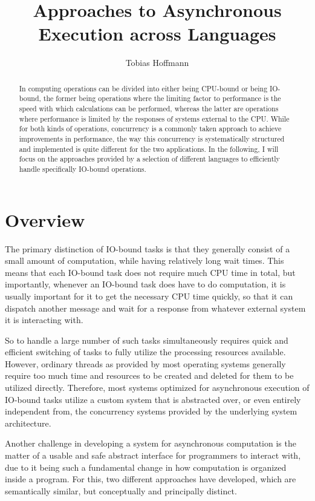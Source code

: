 \documentclass[a4paper,UKenglish,cleveref, autoref, thm-restate]{lipics-v2021}
\title{Approaches to Asynchronous Execution across Languages}
\author{Tobias Hoffmann}{Albert-Ludwigs-Universität Freiburg, Germany}{garbaz@t-online.de}{}{}
\begin{document}
\maketitle

\begin{abstract}
    In computing operations can be divided into either being CPU-bound or being IO-bound, the former being operations where the limiting factor to performance is the speed with which calculations can be performed, whereas the latter are operations where performance is limited by the responses of systems external to the CPU. While for both kinds of operations, concurrency is a commonly taken approach to achieve improvements in performance, the way this concurrency is systematically structured and implemented is quite different for the two applications. In the following, I will focus on the approaches provided by a selection of different languages to efficiently handle specifically IO-bound operations.
\end{abstract}

\section{Overview}
\label{sec:overview}

The primary distinction of IO-bound tasks is that they generally consist of a small amount of computation, while having relatively long wait times. This means that each IO-bound task does not require much CPU time in total, but importantly, whenever an IO-bound task does have to do computation, it is usually important for it to get the necessary CPU time quickly, so that it can dispatch another message and wait for a response from whatever external system it is interacting with.

So to handle a large number of such tasks simultaneously requires quick and efficient switching of tasks to fully utilize the processing resources available. However, ordinary threads as provided by most operating systems generally require too much time and resources to be created and deleted for them to be utilized directly. Therefore, most systems optimized for asynchronous execution of IO-bound tasks utilize a custom system that is abstracted over, or even entirely independent from, the concurrency systems provided by the underlying system architecture.

Another challenge in developing a system for asynchronous computation is the matter of a usable and safe abstract interface for programmers to interact with, due to it being such a fundamental change in how computation is organized inside a program. For this, two different approaches have developed, which are semantically similar, but conceptually and principally distinct.
\end{document}

